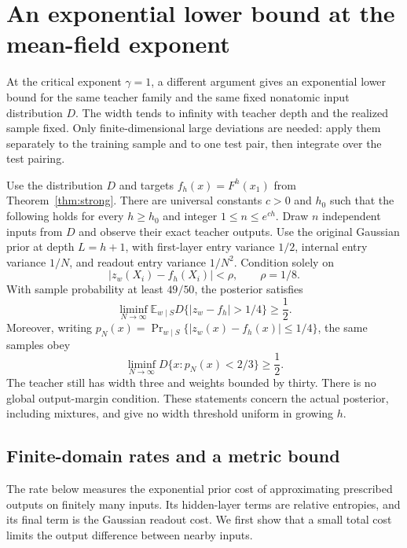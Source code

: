 \section{An exponential lower bound at the mean-field exponent}
\label{sec:critical-depth-lower}

At the critical exponent $\gamma=1$, a different argument gives an
exponential lower bound for the same teacher family and the same fixed
nonatomic input distribution $D$. The width tends to infinity with
teacher depth and the realized sample fixed. Only finite-dimensional
large deviations are needed: apply them separately to the training
sample and to one test pair, then integrate over the test pairing.

\begin{theorem}
\label{thm:critical-regression-depth-lower}
Use the distribution $D$ and targets $f_h(x)=F^h(x_1)$ from
Theorem~\ref{thm:strong}. There are universal constants $c>0$ and $h_0$
such that the following holds for every $h\ge h_0$ and integer
$1\le n\le e^{ch}$. Draw $n$ independent inputs from $D$ and observe
their exact teacher outputs. Use the original Gaussian prior at depth
$L=h+1$, with first-layer entry variance $1/2$, internal entry variance
$1/N$, and readout entry variance $1/N^2$. Condition solely on
\[
 |z_w(X_i)-f_h(X_i)|<\rho,\qquad \rho=1/8.
\]
With sample probability at least $49/50$, the posterior satisfies
\[
 \liminf_{N\to\infty}
 \mathbb E_{w\mid S}D\{|z_w-f_h|>1/4\}\ge\frac12.
\]
Moreover, writing
$p_N(x)=\Pr_{w\mid S}\{|z_w(x)-f_h(x)|\le1/4\}$, the same samples obey
\[
 \liminf_{N\to\infty}D\{x:p_N(x)<2/3\}\ge\frac12.
\]
The teacher still has width three and weights bounded by thirty.
There is no global output-margin condition. These statements concern
the actual posterior, including mixtures, and give no width threshold
uniform in growing $h$.
\end{theorem}

\subsection{Finite-domain rates and a metric bound}

The rate below measures the exponential prior cost of approximating
prescribed outputs on finitely many inputs. Its hidden-layer terms are
relative entropies, and its final term is the Gaussian readout cost.
We first show that a small total cost limits the output difference
between nearby inputs.

